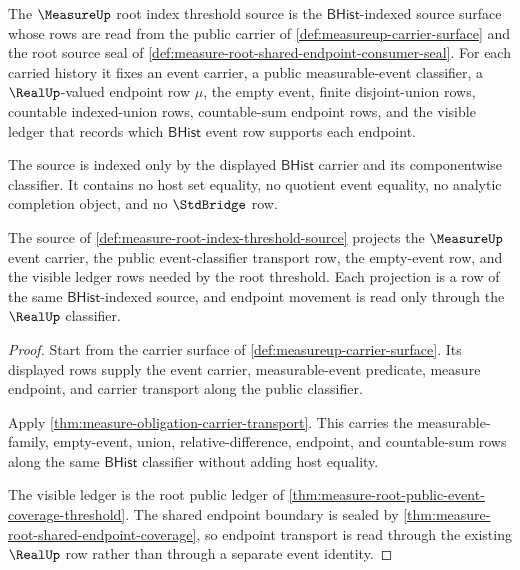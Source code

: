 \begin{definition}
\label{def:measure-root-index-threshold-source}
The $\MeasureUp$ root index threshold source is the $\mathsf{BHist}$-indexed
source surface whose rows are read from the public carrier of
\autoref{def:measureup-carrier-surface} and the root source seal of
\autoref{def:measure-root-shared-endpoint-consumer-seal}. For each carried
history it fixes an event carrier, a public measurable-event classifier, a
$\RealUp$-valued endpoint row $\mu$, the empty event, finite disjoint-union
rows, countable indexed-union rows, countable-sum endpoint rows, and the
visible ledger that records which $\mathsf{BHist}$ event row supports each
endpoint.

The source is indexed only by the displayed $\mathsf{BHist}$ carrier and its
componentwise classifier. It contains no host set equality, no quotient event
equality, no analytic completion object, and no $\StdBridge$ row.
\end{definition}

\begin{theorem}
\label{thm:measure-root-index-carrier-threshold}
The source of \autoref{def:measure-root-index-threshold-source} projects the
$\MeasureUp$ event carrier, the public event-classifier transport row, the
empty-event row, and the visible ledger rows needed by the root threshold. Each
projection is a row of the same $\mathsf{BHist}$-indexed source, and endpoint
movement is read only through the $\RealUp$ classifier.
\end{theorem}
\begin{proof}
Start from the carrier surface of \autoref{def:measureup-carrier-surface}.
Its displayed rows supply the event carrier, measurable-event predicate,
measure endpoint, and carrier transport along the public classifier.

Apply \autoref{thm:measure-obligation-carrier-transport}. This carries the
measurable-family, empty-event, union, relative-difference, endpoint, and
countable-sum rows along the same $\mathsf{BHist}$ classifier without adding
host equality.

The visible ledger is the root public ledger of
\autoref{thm:measure-root-public-event-coverage-threshold}. The shared
endpoint boundary is sealed by
\autoref{thm:measure-root-shared-endpoint-coverage}, so endpoint transport is
read through the existing $\RealUp$ row rather than through a separate event
identity.
\end{proof}

